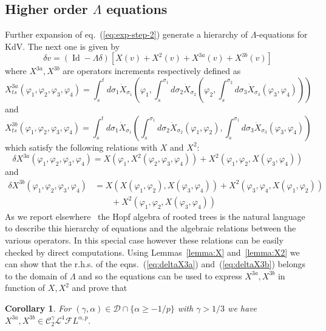 \documentclass[a4paper,11pt,reqno]{article}
\newcommand{\der}{\delta}
\newcommand{\CC}{\mathcal{C}}
\newcommand{\DD}{\mathcal{D}}
\newcommand{\FF}{\mathcal{F}}
\newcommand{\LL}{\mathcal{L}}
\DeclareMathOperator{\id}{\text{Id}}
\newtheorem{corollary}[theorem]{Corollary}
\begin{document}
\subsection{Higher order $\Lambda$ equations}
\label{sec:more}
Further expansion of eq.~(\ref{eq:exp-step-2}) generate a hierarchy of
$\Lambda$-equations for KdV. The next one is given by
\begin{equation}
  \label{eq:hier-next}
  \der v = (\id-\Lambda\der) [X(v) + X^2 (v) + X^{3a}(v) + X^{3b}(v)]
\end{equation}
 where $X^{3a},X^{3b}$ are operators increments respectively defined as
\begin{equation}
  \label{eq:X3a}
  X^{3a}_{ts}(\varphi_1,\varphi_2,\varphi_3,\varphi_4) = \int_s^t
  d\sigma_1 \dot
  X_{\sigma_1}(\varphi_1,\int_s^{\sigma_1}d\sigma_2 \dot X_{\sigma_2}(\varphi_2,
\int_s^{\sigma_2}d\sigma_3 \dot X_{\sigma_3}(\varphi_3,\varphi_4)))
\end{equation}
and
\begin{equation}
  \label{eq:X3b}
  X^{3b}_{ts}(\varphi_1,\varphi_2,\varphi_3,\varphi_4) = \int_s^t
  d\sigma_1 \dot
  X_{\sigma_1}(\int_s^{\sigma_1}d\sigma_2 \dot
  X_{\sigma_2}(\varphi_1,\varphi_2),
\int_s^{\sigma_1}d\sigma_3 \dot
  X_{\sigma_3}(\varphi_3,\varphi_4))
\end{equation}
which satisfy the following relations with $X$ and $X^2$:
\begin{equation}
  \label{eq:deltaX3a}
  \der X^{3a}(\varphi_1,\varphi_2,\varphi_3,\varphi_4) =
  X(\varphi_1,X^2(\varphi_2,\varphi_3,\varphi_4)) + X^2(\varphi_1,\varphi_2,X(\varphi_3,\varphi_4))
\end{equation}
and
\begin{equation}
  \label{eq:deltaX3b}
  \begin{split}
  \der X^{3b}(\varphi_1,\varphi_2,\varphi_3,\varphi_4) & =
  X(X(\varphi_1,\varphi_2),X(\varphi_3,\varphi_4)) +
  X^2(\varphi_3,\varphi_4,X(\varphi_1,\varphi_2))
\\ & \qquad  + X^2(\varphi_1,\varphi_2,X(\varphi_3,\varphi_4))    
  \end{split}
\end{equation}
%
As we report elsewhere~\cite{trees}  the Hopf algebra of rooted trees is
the natural language to describe this hierarchy of equations and the
algebraic relations between the various operators. In this special
case however these relations can be easily checked by direct 
 computations. 
%
Using Lemmas~\ref{lemma:X} and~\ref{lemma:X2} we can show that the r.h.s. of
the eqns.~(\ref{eq:deltaX3a}) and~(\ref{eq:deltaX3b}) belongs to the
domain of $\Lambda$ and so the equations can be used to express
$X^{3a},X^{3b}$ in function of $X,X^2$ and prove that
%
\begin{corollary}
For $(\gamma,\alpha) \in\DD \cap \{\alpha \ge -1/p\}$ with $\gamma>1/3$ we have
$X^{3a},X^{3b} \in \CC_2^\gamma \LL^4 \FF L^{\alpha,p}.$ 
\end{corollary}
\end{document}
